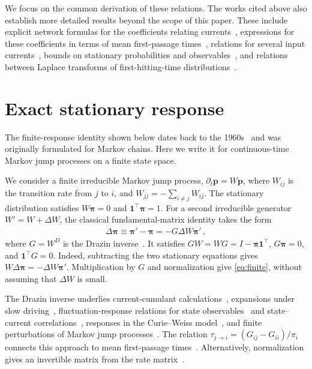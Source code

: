 \documentclass[
  reprint,
  superscriptaddress,
  amsmath,
  amssymb,
  aps,
  pre,
  longbibliography
]{revtex4-2}
\begin{document}
We focus on the common derivation of these relations. The works cited above also establish more detailed results beyond the scope of this paper. 
These include explicit network formulas for the coefficients relating currents~\cite{Harunari2024}, expressions for these coefficients
in terms of mean first-passage times~\cite{Khodabandehlou2025}, relations
for several input currents~\cite{DalCengio2025}, bounds on stationary
probabilities and observables~\cite{BebonSpeck2026}, and relations between
Laplace transforms of first-hitting-time distributions~\cite{VoitsSchwarz2026}.

\section{Exact stationary response}
\label{sec:response}

The finite-response identity shown below dates back to the
1960s~\cite{Schweitzer1968} and was originally formulated for Markov chains. Here we write it for continuous-time Markov jump processes on a finite state space.

We consider a finite irreducible Markov jump process, $\partial_t\bm p=W\bm p$, where $W_{ij}$ is the transition rate from $j$ to $i$, and $W_{jj}=-\sum_{i\ne j}W_{ij}$.
The stationary distribution satisfies $W\bm\pi=0$ and $\bm1^\intercal\bm\pi=1$.
For a second irreducible generator $W'=W+\Delta W$, the classical fundamental-matrix identity takes the form
\begin{align}
    \Delta\bm\pi\equiv\bm\pi'-\bm\pi=-G\Delta W\bm\pi'\,,
    \label{eq:finite}
\end{align}
where $G=W^D$ is the Drazin inverse~\cite{Meyer1975,crook2018drazin,aslyamov2025excess}.
It satisfies $GW=WG=I-\bm\pi\bm1^\intercal$, $G\bm\pi=0$, and $\bm1^\intercal G=0$.
Indeed, subtracting the two stationary equations gives $W\Delta\bm\pi=-\Delta W\bm\pi'$.
Multiplication by $G$ and normalization give \cref{eq:finite}, without assuming that $\Delta W$ is small. 

The Drazin inverse underlies current-cumulant
calculations~\cite{BaiesiMaesNetocny2009}, expansions under slow
driving~\cite{MandalJarzynski2016}, fluctuation-response relations for
state observables~\cite{Ptaszynski2026State} and state--current
correlations~\cite{Ptaszynski2026Mixed}, responses in the Curie--Weiss
model~\cite{PtaszynskiEsposito2025}, and finite perturbations of Markov jump
processes~\cite{BaoLiang2026}. The relation
$\tau_{j\to i}=(G_{ij}-G_{ii})/\pi_i$
connects this approach to mean first-passage
times~\cite{ChoMeyer2000,Harvey2023,Khodabandehlou2025,BaoLiang2026}.
Alternatively, normalization gives an invertible matrix from
the rate matrix~\cite{AslyamovEsposito2024Exact,AslyamovEsposito2024General}.
\end{document}
